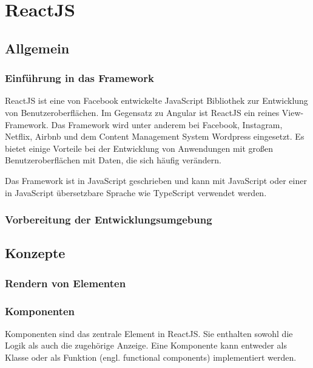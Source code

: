 \chapter{ReactJS}
\label{ch:reactJS}

\section{Allgemein}

\subsection{Einführung in das Framework}

ReactJS ist eine von Facebook entwickelte JavaScript Bibliothek zur Entwicklung von Benutzeroberflächen. Im Gegensatz zu Angular ist ReactJS ein reines View-Framework. Das Framework wird unter anderem bei Facebook, Instagram, Netflix, Airbnb und dem Content Management System Wordpress eingesetzt. Es bietet einige Vorteile bei der Entwicklung von Anwendungen mit großen Benutzeroberflächen mit Daten, die sich häufig verändern. 

Das Framework ist in JavaScript geschrieben und kann mit JavaScript oder einer in JavaScript übersetzbare Sprache wie TypeScript verwendet werden.\autocites[vgl.][1\psqq]{Gackenheimer.2015}[vgl.][3\psqq]{Zeigermann.2016}


\subsection{Vorbereitung der Entwicklungsumgebung}



\section{Konzepte}

\subsection{Rendern von Elementen}


\subsection{Komponenten}
Komponenten sind das zentrale Element in ReactJS. Sie enthalten sowohl die Logik als auch die zugehörige Anzeige. Eine Komponente kann entweder als Klasse oder als Funktion (engl. functional components) implementiert werden.  %

